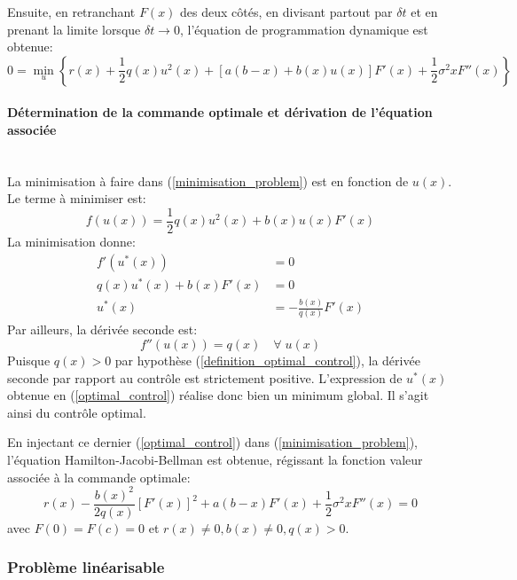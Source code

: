 Ensuite, en retranchant $F(x)$ des deux côtés, en divisant partout par $\delta t$ et en prenant la limite lorsque $\delta t\to0$, l'équation de programmation dynamique est obtenue:
\begin{equation}\label{minimisation_problem}
    0=\min_u\left\{r(x)+\frac{1}{2}q(x)u^2(x)+[a(b-x)+b(x)u(x)]F'(x)+\frac{1}{2}\sigma^2xF''(x)\right\}
\end{equation}
\paragraph{Détermination de la commande optimale et dérivation de l'équation associée}\phantom{}\\
La minimisation à faire dans (\ref{minimisation_problem}) est en fonction de $u(x)$. Le terme à minimiser est:
\[
f(u(x))=\frac{1}{2}q(x)u^2(x)+b(x)u(x)F'(x)
\]
La minimisation donne:
\begin{equation}\label{optimal_control}
    \begin{aligned}
        f'(u^*(x))&=0\\
        q(x)u^*(x)+b(x)F'(x)&=0\\
    u^*(x)&=-\frac{b(x)}{q(x)}F'(x)
    \end{aligned}
\end{equation}
Par ailleurs, la dérivée seconde est: 
\[
f''(u(x))=q(x)\quad\forall\;u(x)
\]
Puisque \( q(x) > 0 \) par hypothèse (\ref{definition_optimal_control}), la dérivée seconde par rapport au contrôle est strictement positive. L'expression de \( u^*(x) \) obtenue en (\ref{optimal_control}) réalise donc bien un minimum global. Il s'agit ainsi du contrôle optimal.

En injectant ce dernier (\ref{optimal_control}) dans (\ref{minimisation_problem}), l'équation Hamilton-Jacobi-Bellman est obtenue, régissant la fonction valeur associée à la commande optimale:
\begin{equation}\label{control_equation}
    r(x) - \frac{{b(x)}^2}{2q(x)}{\left[F'(x)\right]}^2 + a(b - x)F'(x) + \frac{1}{2}\sigma^2 x F''(x) = 0
\end{equation}
avec $F(0)=F(c)=0$ et $r(x)\neq0, b(x)\neq0, q(x)>0$.


\subsubsection{Problème linéarisable}

